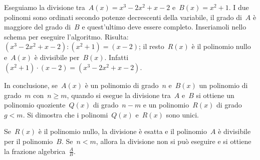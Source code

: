 \begin{exrig}
 \begin{esempio}
 Eseguiamo la divisione tra~$A(x)=x^{3}-2x^{2}+x-2$ e~$B(x)=x^{2}+1$.
I due polinomi sono ordinati secondo potenze decrescenti della variabile, il grado di~$A$ è maggiore del grado di~$B$ e quest'ultimo
deve essere completo. Inseriamoli nello schema per eseguire l'algoritmo. Risulta:
$\left(x^{3}-2x^{2}+x-2\right):\left(x^{2}+1\right)=(x-2)$; il resto~$R(x)$ è il polinomio nullo e~$A(x)$ è divisibile per~$B(x)$.
Infatti~$\left(x^{2}+1\right)\cdot (x-2)=\left(x^{3}-2x^{2}+x-2\right)$.
\begin{center}
 \vspace*{-1.10ex}
\end{center}
 \end{esempio}
\end{exrig}

In conclusione, se~$A(x)$ è un polinomio di grado~$n$ e~$B(x)$ un polinomio di grado~$m$ con~$n\ge m$, quando si esegue
la divisione tra~$A$ e~$B$ si ottiene un polinomio quoziente~$Q(x)$ di grado~$n-m$ e un polinomio~$R(x)$ di grado~$g<m$.
Si dimostra che i polinomi~$Q(x)$ e~$R(x)$ sono unici.

Se~$R(x)$ è il polinomio nullo, la divisione è esatta e il polinomio~$A$ è divisibile per il polinomio~$B$.
Se~$n<m$, allora la divisione non si può eseguire e si ottiene la frazione algebrica~$\frac{A}{B}$.

\vspazio\ovalbox{\risolvii \ref{ese:12.1}, \ref{ese:12.2}, \ref{ese:12.3}, \ref{ese:12.4}, \ref{ese:12.5}}

